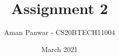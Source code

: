 \documentclass[journal,12pt,twocolumn]{IEEEtran}
\date{March 2021}
\DeclareMathOperator*{\Res}{Res}
\begin{document}
\newcommand{\BEQA}{\begin{eqnarray}}
\newcommand{\EEQA}{\end{eqnarray}}
\newcommand{\define}{\stackrel{\triangle}{=}}

\raggedbottom
\setlength{\parindent}{0pt}
\providecommand{\mbf}{\mathbf}
\providecommand{\pr}[1]{\ensuremath{\Pr\left(#1\right)}}
\providecommand{\qfunc}[1]{\ensuremath{Q\left(#1\right)}}
\providecommand{\fn}[1]{\ensuremath{f\left(#1\right)}}
\providecommand{\e}[1]{\ensuremath{E\left(#1\right)}}
\providecommand{\sbrak}[1]{\ensuremath{{}\left[#1\right]}}
\providecommand{\lsbrak}[1]{\ensuremath{{}\left[#1\right.}}
\providecommand{\rsbrak}[1]{\ensuremath{{}\left.#1\right]}}
\providecommand{\brak}[1]{\ensuremath{\left(#1\right)}}
\providecommand{\lbrak}[1]{\ensuremath{\left(#1\right.}}
\providecommand{\rbrak}[1]{\ensuremath{\left.#1\right)}}
\providecommand{\cbrak}[1]{\ensuremath{\left\{#1\right\}}}
\providecommand{\lcbrak}[1]{\ensuremath{\left\{#1\right.}}
\providecommand{\rcbrak}[1]{\ensuremath{\left.#1\right\}}}



\theoremstyle{remark}
\newtheorem{rem}{Remark}
\newcommand{\sgn}{\mathop{\mathrm{sgn}}}
\providecommand{\abs}[1]{\vert#1\vert}
\providecommand{\res}[1]{\Res\displaylimits_{#1}} 
\providecommand{\norm}[1]{\lVert#1\rVert}
\providecommand{\mtx}[1]{\mathbf{#1}}
\providecommand{\mean}[1]{E[ #1 ]}
\providecommand{\fourier}{\overset{\mathcal{F}}{ \rightleftharpoons}}
\providecommand{\system}{\overset{\mathcal{H}}{ \longleftrightarrow}}
\newcommand{\solution}{\noindent \textbf{Solution: }}
\newcommand{\Int}{\int\limits}
\newcommand{\cosec}{\,\text{cosec}\,}
\providecommand{\dec}[2]{\ensuremath{\overset{#1}{\underset{#2}{\gtrless}}}}
\newcommand{\myvec}[1]{\ensuremath{\begin{pmatrix}#1\end{pmatrix}}}
\newcommand{\mydet}[1]{\ensuremath{\begin{vmatrix}#1\end{vmatrix}}}
\makeatletter
\vspace{3cm}
\title{Assignment 2}
\author{Aman Panwar - CS20BTECH11004}
\maketitle
\newpage
\bigskip
\renewcommand{\thetable}{\theenumi}
\end{document}
